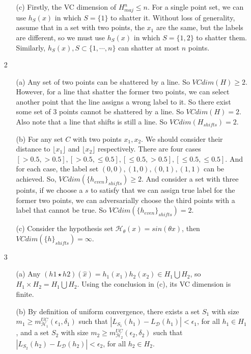 \documentclass{article}
\begin{document}
\begin{itemize}
\begin{itemize}
\begin{itemize}
			\end{itemize}
			\item[(c)] Firstly, the VC dimension of $H_{maj}^n\leq n$. For a single point set, we can use $h_S(x)$ in which $S=\{1\}$ to shatter it. Without loss of generality, assume that in a set with two points, the $x_1$ are the same, but the labels are different, so we must use $h_S(x)$ in which $S=\{1,2\}$ to shatter them. Similarly, $h_S(x), S\subset \{1,\cdots, n\}$ can shatter at most $n$ points.
		\end{itemize}
		
\item[2] \begin{itemize}
		\item[(a)] Any set of two points can be shattered by a line. So $VCdim(H)\geq 2$. However, for a line that shatter the former two points, we can select another point that the line assigns a wrong label to it. So there exist some set of 3 points cannot be shattered by a line. So $VCdim(H)=2$. Also note that a line that shifts is still a line. So $VCdim(H_{shifts})=2$.
		\item[(b)]  For any set $C$ with two points $x_1, x_2$. We should consider their distance to $\lfloor x_1 \rfloor$  and $\lfloor x_2 \rfloor$ respectively. There are four cases $[>0.5, >0.5], [>0.5,\leq 0.5], [\leq 0.5, >0.5], [\leq 0.5, \leq 0.5]$. And for each case, the label set $(0,0), (1,0), (0,1), (1,1)$ can be achieved. So, $VCdim(\{h_{even}\}_{shifts})\geq 2$. And consider a set with three points, if we choose a $s$ to satisfy that we can assign true label for the former two points, we can adversarially choose the third points with a label that cannot be true. So  $VCdim(\{h_{even}\}_{shifts})= 2$.
		\item[(c)] Consider the hypothesis set $\mathcal{H}_\theta(x)=sin(\theta x)$, then $VCdim(\{h\}_{shifts})=\infty$.
		\end{itemize}
		
\item[3] \begin{itemize}
	\item[(a)] Any $(h1\star h2)(\hat{x})=h_1(x_1)h_2(x_2) \in H_1 \bigcup H_2$, so $H_1\times H_2=H_1 \bigcup H_2$. Using the conclusion in (c), its VC dimension is finite.
	\item[(b)] By definition of uniform convergence, there exists a set $S_1$ with size $m_1\geq m_{\mathcal{H}_1}^{UC}(\epsilon_1,\delta_1)$ such that $|L_{S_1}(h_1)-L_{\mathcal{D}}(h_1)|<\epsilon_1 $, for all $h_1\in H_1$, and a set $S_2$ with size $m_2\geq m_{\mathcal{H}_2}^{UC}(\epsilon_2,\delta_2)$ such that $|L_{S_2}(h_2)-L_{\mathcal{D}}(h_2)|<\epsilon_2 $, for all $h_2\in H_2$.
	

\end{itemize}
\end{itemize}
\end{document}
